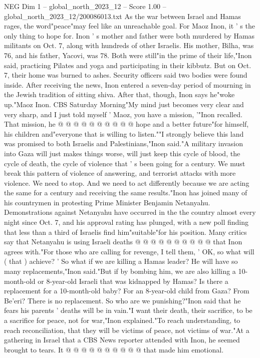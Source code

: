 \begin{textsample}{NEG Dim 1 – global\_north\_2023\_12 – Score 1.00 – global\_north\_2023\_12/200086013.txt}  \label{ex:f1_neg_204}
As the war between Israel and Hamas rages, the word"peace"may feel like an unreachable goal.
For Maoz Inon, it ' s the only thing to hope for.
Inon ' s mother and father were both murdered by Hamas militants on Oct. 7, along with hundreds of other Israelis.
His mother, Bilha, was 76, and his father, Yacovi, was 78.
Both were still"in the prime of their life,"Inon said, practicing Pilates and yoga and participating in their kibbutz.
But on Oct. 7, their home was burned to ashes.
Security officers said two bodies were found inside.
After receiving the news, Inon entered a seven-day period of mourning in the Jewish tradition of sitting shiva.
After that, though, Inon says he"woke up."Maoz Inon.
CBS Saturday Morning"My mind just becomes very clear and very sharp, and I just told myself ' Maoz, you have a mission, '"Inon recalled.
That mission, he @ @ @ @ @ @ @ @ @ @ hope and a better future"for himself, his children and"everyone that is willing to listen.""I strongly believe this land was promised to both Israelis and Palestinians,"Inon said."A military invasion into Gaza will just makes things worse, will just keep this cycle of blood, the cycle of death, the cycle of violence that ' s been going for a century.
We must break this pattern of violence of answering, and terrorist attacks with more violence.
We need to stop.
And we need to act differently because we are acting the same for a century and receiving the same results."Inon has joined many of his countrymen in protesting Prime Minister Benjamin Netanyahu.
Demonstrations against Netanyahu have occurred in the the country almost every night since Oct. 7, and his approval rating has plunged, with a new poll finding that less than a third of Israelis find him"suitable"for his position.
Many critics say that Netanyahu is using Israeli deaths @ @ @ @ @ @ @ @ @ @ that Inon agrees with."For those who are calling for revenge, I tell them, ' OK, so what will ( that ) achieve? ' So what if we are killing a Hamas leader?
He will have so many replacements,"Inon said."But if by bombing him, we are also killing a 10-month-old or 8-year-old Israeli that was kidnapped by Hamas?
Is there a replacement for a 10-month-old baby?
For an 8-year-old child from Gaza?
From Be'eri?
There is no replacement.
So who are we punishing?"Inon said that he fears his parents ' deaths will be in vain."I want their death, their sacrifice, to be a sacrifice for peace, not for war,"Inon explained."To reach understanding, to reach reconciliation, that they will be victims of peace, not victims of war."At a gathering in Israel that a CBS News reporter attended with Inon, he seemed brought to tears.
It @ @ @ @ @ @ @ @ @ @ that made him emotional.

\end{textsample}
